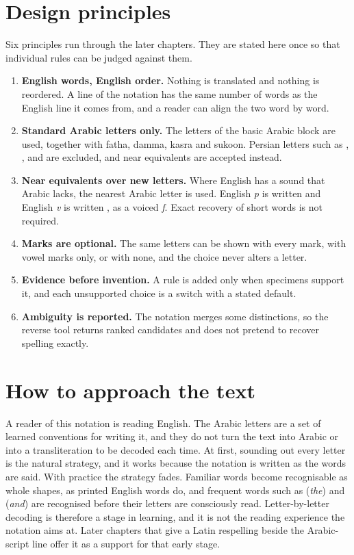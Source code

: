 \section{Design principles}
Six principles run through the later chapters. They are stated here once so that individual rules can be judged against them.
\begin{enumerate}
\item \textbf{English words, English order.} Nothing is translated and nothing is reordered. A line of the notation has the same number of words as the English line it comes from, and a reader can align the two word by word.
\item \textbf{Standard Arabic letters only.} The letters of the basic Arabic block are used, together with fatha, damma, kasra and sukoon. Persian letters such as , ,  and  are excluded, and near equivalents are accepted instead.
\item \textbf{Near equivalents over new letters.} Where English has a sound that Arabic lacks, the nearest Arabic letter is used. English \emph{p} is written  and English \emph{v} is written , as a voiced \emph{f}. Exact recovery of short words is not required.
\item \textbf{Marks are optional.} The same letters can be shown with every mark, with vowel marks only, or with none, and the choice never alters a letter.
\item \textbf{Evidence before invention.} A rule is added only when specimens support it, and each unsupported choice is a switch with a stated default.
\item \textbf{Ambiguity is reported.} The notation merges some distinctions, so the reverse tool returns ranked candidates and does not pretend to recover spelling exactly.
\end{enumerate}

\section{How to approach the text}
A reader of this notation is reading English. The Arabic letters are a set of learned conventions for writing it, and they do not turn the text into Arabic or into a transliteration to be decoded each time. At first, sounding out every letter is the natural strategy, and it works because the notation is written as the words are said. With practice the strategy fades. Familiar words become recognisable as whole shapes, as printed English words do, and frequent words such as  (\emph{the}) and  (\emph{and}) are recognised before their letters are consciously read. Letter-by-letter decoding is therefore a stage in learning, and it is not the reading experience the notation aims at. Later chapters that give a Latin respelling beside the Arabic-script line offer it as a support for that early stage.

